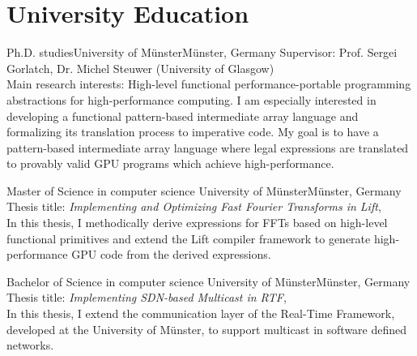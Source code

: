 \documentclass[11pt,a4paper]{moderncv}        %
\begin{document}
\nocite{*}
\makecvtitle

\section{University Education}
            {Ph.D. studies}{University of Münster}{Münster, Germany}{}
            {Supervisor: Prof. Sergei Gorlatch, Dr. Michel Steuwer (University of Glasgow)\\
             Main research interests:
             High-level functional performance-portable programming abstractions for high-performance computing.
             I am especially interested in developing a functional pattern-based intermediate array language and formalizing its translation process to imperative code.
             My goal is to have a pattern-based intermediate array language where legal expressions are translated to provably valid GPU programs which achieve high-performance.} 

		    {Master of Science in computer science}
            {University of Münster}{Münster, Germany}
            {}
            {Thesis title: \textit{Implementing and Optimizing Fast Fourier Transforms in Lift},\\
           In this thesis, I methodically derive expressions for FFTs based on high-level functional primitives and extend the Lift compiler framework to generate high-performance GPU code from the derived expressions.}

            {Bachelor of Science in computer science}
            {University of Münster}{Münster, Germany}
            {}
            {Thesis title: \textit{Implementing SDN-based Multicast in RTF},\\
          In this thesis, I extend the communication layer of the Real-Time Framework, developed at the University of Münster, to support multicast in software defined networks.}

\printbibheading[title={Publications}]
\printbibliography[heading=none]
%
%
\end{document}

